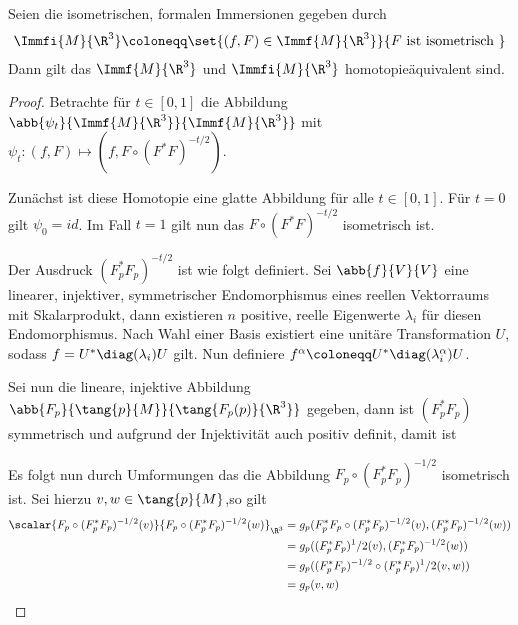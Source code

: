 \begin{Satz}
  Seien die isometrischen, formalen Immersionen gegeben durch
  \begin{gather*}
    \Immfi{M}{\R^3} \coloneqq \set{(f,F) \in \Immf{M}{\R^3}}{F \text{
        ist isometrisch }}
  \end{gather*}
  Dann gilt das $\Immf{M}{\R^3}$ und $\Immfi{M}{\R^3}$
  homotopieäquivalent sind.
	\begin{proof}
          Betrachte für $t \in [0,1]$ die Abbildung
          $\abb{\psi_t}{\Immf{M}{\R^3}}{\Immf{M}{\R^3}}$ mit
          $\psi_t : (f,F) \mapsto (f,F \circ
          (F^{\ast}F)^{-t/2})$.
		
          Zunächst ist diese Homotopie eine glatte Abbildung für alle
          $ t \in [0,1] $. Für $ t=0 $ gilt $ \psi_0 = id $. Im Fall
          $ t=1 $ gilt nun das $ F \circ (F^{\ast}F)^{-t/2} $
          isometrisch ist.
		
          Der Ausdruck $ (F_p^\ast F_p)^{-t/2} $ ist wie folgt
          definiert. Sei $ \abb{f}{V}{V} $ eine linearer, injektiver,
          symmetrischer Endomorphismus eines reellen Vektorraums mit
          Skalarprodukt, dann existieren $ n $ positive, reelle
          Eigenwerte $ \lambda_i $ für diesen Endomorphismus. Nach
          Wahl einer Basis existiert eine unitäre Transformation
          $ U $, sodass $ f = U^\ast \diag(\lambda_i) U $ gilt. Nun
          definiere
          $ f^\alpha \coloneqq U^\ast \diag(\lambda_i^\alpha) U $.
		
          Sei nun die lineare, injektive Abbildung
          $ \abb{F_p}{\tang{p}{M}}{\tang{F_p(p)}{\R^3}} $ gegeben,
          dann ist $ (F_p^\ast F_p) $ symmetrisch und aufgrund der
          Injektivität auch positiv definit, damit ist
		
          Es folgt nun durch Umformungen das die Abbildung
          $ F_p \circ (F_p^\ast F_p)^{-1/2} $ isometrisch
          ist. Sei hierzu $ v,w \in \tang{p}{M} $,so gilt
          \begin{align*}
            \scalar{F_p \circ (F_p^\ast F_p)^{-1/2}(v)}{F_p \circ (F_p^\ast F_p)^{-1/2}(w)}_{\R^3} &=
                                                                                                                     g_p(F_p^\ast F_p \circ (F_p^\ast F_p)^{-1/2}(v),(F_p^\ast F_p)^{-1/2}(w)) \\
                                                                                                                   &= g_p((F_p^\ast F_p)^1/2(v),(F_p^\ast F_p)^{-1/2}(w)) \\
                                                                                                                   &= g_p((F_p^\ast F_p)^{-1/2} \circ (F_p^\ast F_p)^1/2(v,w)) \\
                                                                                                                   &= g_p(v,w)
		\end{align*}
		

\end{proof}
\end{Satz}
